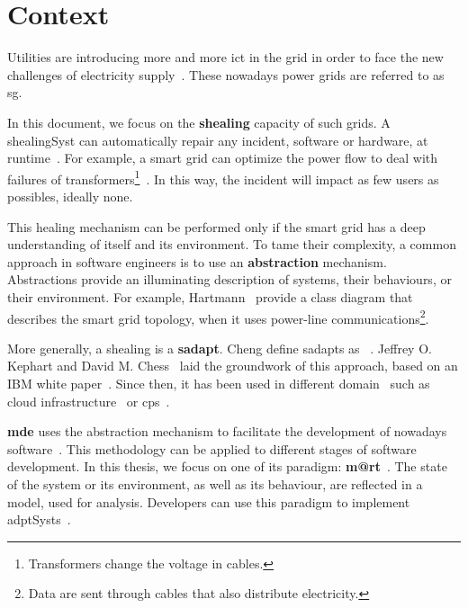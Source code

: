 \section{Context}
Utilities are introducing more and more \gls{ict} in the grid in order to face the new challenges of electricity supply~\cite{farhangi2010path, ipakchi2009grid, DBLP:journals/comsur/FangMXY12}.
These nowadays power grids are referred to as \gls{sg}.

In this document, we focus on the \textbf{\gls{shealing}} capacity of such grids.
A \gls{shealingSyst} can automatically repair any incident, software or hardware, at runtime~\cite{DBLP:journals/computer/KephartC03}.
For example, a smart grid can optimize the power flow to deal with failures of transformers\footnote{Transformers change the voltage in cables.}~\cite{DBLP:journals/comsur/FangMXY12}.
In this way, the incident will impact as few users as possibles, ideally none. 

This healing mechanism can be performed only if the smart grid has a deep understanding of itself and its environment.
To tame their complexity, a common approach in software engineers is to use an \textbf{abstraction} mechanism.
Abstractions provide an illuminating description of systems, their behaviours, or their environment.
For example, Hartmann~\etal \cite{DBLP:conf/smartgridcomm/0001FKTPTR14} provide a class diagram that describes the smart grid topology, when it uses power-line communications\footnote{Data are sent through cables that also distribute electricity.}.

\bigskip

More generally, a \gls{shealing} is a \textbf{\gls{sadapt}}. 
Cheng \etal define \glspl{sadapt} as ~\cite{DBLP:conf/dagstuhl/ChengLGIMABBBCSDFGGGKKKLMMMPSTTWW09}.
Jeffrey O. Kephart and David M. Chess~\cite{DBLP:journals/computer/KephartC03} laid the groundwork of this approach, based on an IBM white paper~\cite{computing2006architectural}.
Since then, it has been used in different domain~\cite{DBLP:journals/corr/abs-1904-01518} such as cloud infrastructure~\cite{DBLP:conf/icac/JavadiG17, OpenStack:Watcher:Wiki, DBLP:conf/icse/BarnaKFL17} or \gls{cps}~\cite{DBLP:conf/icac/LalandaGC17, DBLP:conf/cbse/FouquetMFBPJ12, DBLP:conf/smartgridsec/0001FKNT14}.

\textbf{\Gls{mde}} uses the abstraction mechanism to facilitate the development of nowadays software~\cite{DBLP:journals/computer/Schmidt06, DBLP:conf/ifm/Kent02, DBLP:series/synthesis/2017Brambilla}.
This methodology can be applied to different stages of software development.
In this thesis, we focus on one of its paradigm: \textbf{\gls{m@rt}}~\cite{DBLP:journals/computer/BlairBF09, DBLP:journals/computer/MorinBJFS09}.
The state of the system or its environment, as well as its behaviour, are reflected in a model, used for analysis.
Developers can use this paradigm to implement \glspl{adptSyst}~\cite{DBLP:journals/computer/MorinBJFS09, DBLP:conf/smartgridsec/0001FKNT14}.

